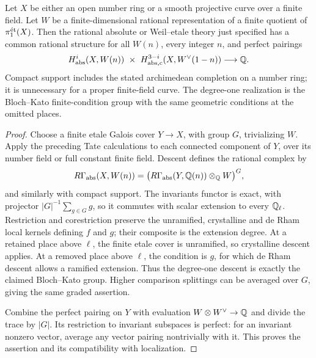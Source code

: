 \begin{corollary}
\label{cor:B-Artin-Tate-duality}
Let \(X\) be either an open number ring or a smooth projective
curve over a finite field.  Let \(W\) be a finite-dimensional
rational representation of a finite quotient of
\(\pi_1^{\mathrm{\acute et}}(X)\).  Then the rational absolute or Weil--etale
theory just specified has a common rational structure for all
\(W(n)\), every integer \(n\), and perfect pairings
\[
 H^i_{\rm abs}(X,W(n))\ \times\
 H^{3-i}_{\rm abs,c}(X,W^\vee(1-n))\longrightarrow\Q.
\]
Compact support includes the stated archimedean completion on a
number ring; it is unnecessary for a proper finite-field curve.
The degree-one realization is the Bloch--Kato finite-condition
group with the same geometric conditions at the omitted places.
\end{corollary}
\begin{proof}
Choose a finite etale Galois cover \(Y\to X\), with group \(G\),
trivializing \(W\).  Apply the preceding Tate calculations to
each connected component of \(Y\), over its number field or full
constant finite field.  Descent defines the rational complex by
\[
 R\Gamma_{\rm abs}(X,W(n))=
  \bigl(R\Gamma_{\rm abs}(Y,\mathbb Q(n))\otimes_\mathbb Q W\bigr)^G,
\]
and similarly with compact support.  The invariants functor is
exact, with projector \(|G|^{-1}\sum_{g\in G}g\), so it commutes
with scalar extension to every \(\mathbb Q_\ell\).  Restriction and
corestriction preserve the unramified, crystalline and de Rham
local kernels defining \(f\) and \(g\); their composite is
the extension degree.  At a retained place above \(\ell\),
the finite etale cover is unramified, so crystalline descent
applies.  At a removed place above \(\ell\), the condition is
\(g\), for which de Rham descent allows a ramified extension.
Thus the degree-one descent is exactly
the claimed Bloch--Kato group.  Higher comparison splittings
can be averaged over \(G\), giving the same graded assertion.

Combine the perfect pairing on \(Y\) with evaluation
\(W\otimes W^\vee\to\mathbb Q\) and divide the trace by \(|G|\).
Its restriction to invariant subspaces is perfect: for an invariant
nonzero vector, average any vector pairing nontrivially with it.
This proves the assertion and its compatibility with localization.
\end{proof}

